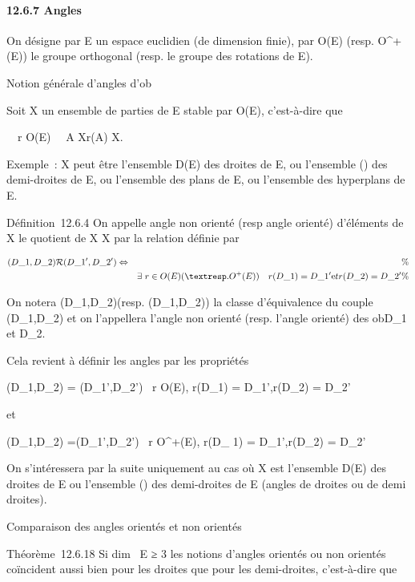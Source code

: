 \documentclass[]{article}
\begin{document}
\paragraph{12.6.7 Angles}

On désigne par E un espace euclidien (de dimension finie), par O(E)
(resp. O^+(E)) le groupe orthogonal (resp. le groupe des
rotations de E).

Notion générale d'angles d'ob\jmathets

Soit X un ensemble de parties de E stable par O(E), c'est-à-dire que

\forall~~r \in O(E)\quad
\forall~~A \in X\quad r(A) \in X.

Exemple~: X peut être l'ensemble D(E) des droites de E, ou l'ensemble
\tildeD() des demi-droites de E, ou l'ensemble des
plans de E, ou l'ensemble des hyperplans de E.

Définition~12.6.4 On appelle angle non orienté (resp angle orienté)
d'éléments de X le quotient de X \times X par la relation  définie par

\begin{align*}
(D\_1,D\_2)\mathcal{R}(D\_1',D\_2')
\Leftrightarrow&& \%& \\
& & \exists~r \in O(E) (\textresp.
O^+(E))\quad r(D\_ 1) =
D\_1'\text et r(D\_2) =
D\_2'\%& \\
\end{align*}

On notera \overline(D\_1,D\_2)(resp.
\widehat(D\_1,D\_2)) la classe
d'équivalence du couple (D\_1,D\_2) et on l'appellera
l'angle non orienté (resp. l'angle orienté) des ob\jmathets D\_1 et
D\_2.

Cela revient à définir les angles par les propriétés

\overline(D\_1,D\_2) =
\overline(D\_1',D\_2')
\Leftrightarrow \exists~r \in O(E),
\quad r(D\_1) = D\_1',r(D\_2) =
D\_2'

et

\widehat(D\_1,D\_2)
=\widehat (D\_1',D\_2')
\Leftrightarrow \exists~r \in
O^+(E), \quad r(D\_ 1) =
D\_1',r(D\_2) = D\_2'

On s'intéressera par la suite uniquement au cas où X est l'ensemble D(E)
des droites de E ou l'ensemble \tildeD() des
demi-droites de E (angles de droites ou de demi droites).

Comparaison des angles orientés et non orientés

Théorème~12.6.18 Si dim~ E ≥ 3 les notions
d'angles orientés ou non orientés coïncident aussi bien pour les droites
que pour les demi-droites, c'est-à-dire que
\end{document}
